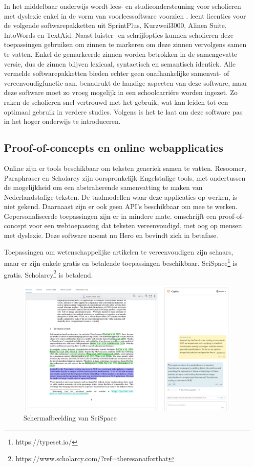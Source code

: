 In het middelbaar onderwijs wordt lees- en studieondersteuning voor scholieren met dyslexie enkel in de vorm van voorleessoftware voorzien \autocite{DeCraemer2018, OnderwijsVlaanderen2023}. \textcite{OnderwijsVlaanderen2023} leent licenties voor de volgende softwarepakketten uit SprintPlus, Kurzweil3000, Alinea Suite, IntoWords en TextAid. Naast luister- en schrijfopties kunnen scholieren deze toepassingen gebruiken om zinnen te markeren om deze zinnen vervolgens samen te vatten. Enkel de gemarkeerde zinnen worden betrokken in de samengevatte versie, dus de zinnen blijven lexicaal, syntactisch en semantisch identiek. Alle vermelde softwarepakketten bieden echter geen onafhankelijke samenvat- of vereenvoudigfunctie aan. \textcite{Tops2018} benadrukt de handige aspecten van deze software, maar deze software moet zo vroeg mogelijk in een schoolcarriére worden ingezet. Zo raken de scholieren snel vertrouwd met het gebruik, wat kan leiden tot een optimaal gebruik in verdere studies. Volgens \textcite{Tops2018} is het te laat om deze software pas in het hoger onderwijs te introduceren.

\subsection{Proof-of-concepts en online webapplicaties}

Online zijn er tools beschikbaar om teksten generiek samen te vatten. Resoomer, Paraphraser en Scholarcy zijn oorspronkelijk Engelstalige tools, met ondertussen de mogelijkheid om een abstraherende samenvatting te maken van Nederlandstalige teksten. De taalmodellen waar deze applicaties op werken, is niet gekend. Daarnaast zijn er ook geen API's beschikbaar om mee te werken. Gepersonaliseerde toepassingen zijn er in mindere mate. \textcite{Bingel2018} omschrijft een proof-of-concept voor een webtoepassing dat teksten vereenvoudigd, met oog op mensen met dyslexie. Deze software noemt nu Hero en bevindt zich in betafase.

Toepassingen om wetenschappelijke artikelen te vereenvoudigen zijn schaars, maar er zijn enkele gratis en betalende toepassingen beschikbaar. SciSpace\footnote{https://typeset.io/} is gratis. Scholarcy\footnote{https://www.scholarcy.com/?ref=theresanaiforthat} is betalend. 

\begin{figure}
	\includegraphics{img/typeset-example.png}
	\caption{Schermafbeelding van SciSpace}
\end{figure}

